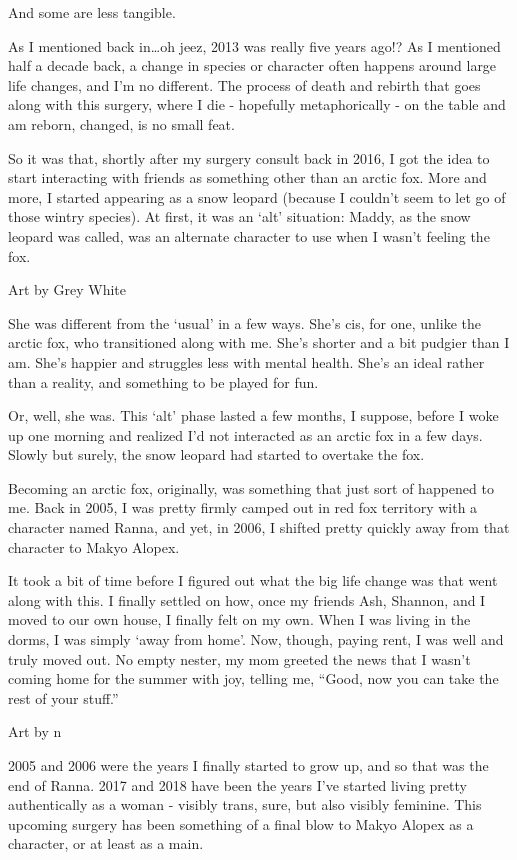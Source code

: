 And some are less tangible.

As I mentioned back in\ldots{}oh jeez, 2013 was really five years ago!? As I mentioned half a decade back, a change in species or character often happens around large life changes, and I'm no different. The process of death and rebirth that goes along with this surgery, where I die - hopefully metaphorically - on the table and am reborn, changed, is no small feat.

So it was that, shortly after my surgery consult back in 2016, I got the idea to start interacting with friends as something other than an arctic fox. More and more, I started appearing as a snow leopard (because I couldn't seem to let go of those wintry species). At first, it was an `alt' situation: Maddy, as the snow leopard was called, was an alternate character to use when I wasn't feeling the fox.

Art by Grey White

She was different from the `usual' in a few ways. She's cis, for one, unlike the arctic fox, who transitioned along with me. She's shorter and a bit pudgier than I am. She's happier and struggles less with mental health. She's an ideal rather than a reality, and something to be played for fun.

Or, well, she was. This `alt' phase lasted a few months, I suppose, before I woke up one morning and realized I'd not interacted as an arctic fox in a few days. Slowly but surely, the snow leopard had started to overtake the fox.

Becoming an arctic fox, originally, was something that just sort of happened to me. Back in 2005, I was pretty firmly camped out in red fox territory with a character named Ranna, and yet, in 2006, I shifted pretty quickly away from that character to Makyo Alopex.

It took a bit of time before I figured out what the big life change was that went along with this. I finally settled on how, once my friends Ash, Shannon, and I moved to our own house, I finally felt on my own. When I was living in the dorms, I was simply `away from home'. Now, though, paying rent, I was well and truly moved out. No empty nester, my mom greeted the news that I wasn't coming home for the summer with joy, telling me, ``Good, now you can take the rest of your stuff.''

Art by n

2005 and 2006 were the years I finally started to grow up, and so that was the end of Ranna. 2017 and 2018 have been the years I've started living pretty authentically as a woman - visibly trans, sure, but also visibly feminine. This upcoming surgery has been something of a final blow to Makyo Alopex as a character, or at least as a main.

